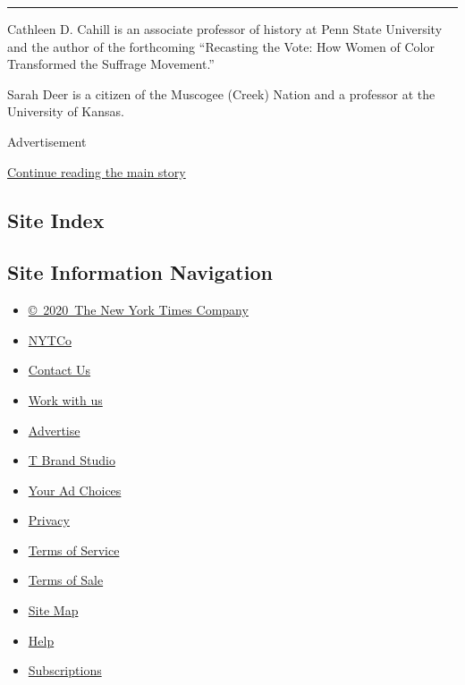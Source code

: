 \begin{center}\rule{0.5\linewidth}{\linethickness}\end{center}

Cathleen D. Cahill is an associate professor of history at Penn State
University and the author of the forthcoming ``Recasting the Vote: How
Women of Color Transformed the Suffrage Movement.''

Sarah Deer is a citizen of the Muscogee (Creek) Nation and a professor
at the University of Kansas.

Advertisement

\protect\hyperlink{after-bottom}{Continue reading the main story}

\hypertarget{site-index}{%
\subsection{Site Index}\label{site-index}}

\hypertarget{site-information-navigation}{%
\subsection{Site Information
Navigation}\label{site-information-navigation}}

\begin{itemize}
\tightlist
\item
  \href{https://help.nytimes.com/hc/en-us/articles/115014792127-Copyright-notice}{©~2020~The
  New York Times Company}
\end{itemize}

\begin{itemize}
\tightlist
\item
  \href{https://www.nytco.com/}{NYTCo}
\item
  \href{https://help.nytimes.com/hc/en-us/articles/115015385887-Contact-Us}{Contact
  Us}
\item
  \href{https://www.nytco.com/careers/}{Work with us}
\item
  \href{https://nytmediakit.com/}{Advertise}
\item
  \href{http://www.tbrandstudio.com/}{T Brand Studio}
\item
  \href{https://www.nytimes.com/privacy/cookie-policy\#how-do-i-manage-trackers}{Your
  Ad Choices}
\item
  \href{https://www.nytimes.com/privacy}{Privacy}
\item
  \href{https://help.nytimes.com/hc/en-us/articles/115014893428-Terms-of-service}{Terms
  of Service}
\item
  \href{https://help.nytimes.com/hc/en-us/articles/115014893968-Terms-of-sale}{Terms
  of Sale}
\item
  \href{https://spiderbites.nytimes.com}{Site Map}
\item
  \href{https://help.nytimes.com/hc/en-us}{Help}
\item
  \href{https://www.nytimes.com/subscription?campaignId=37WXW}{Subscriptions}
\end{itemize}
